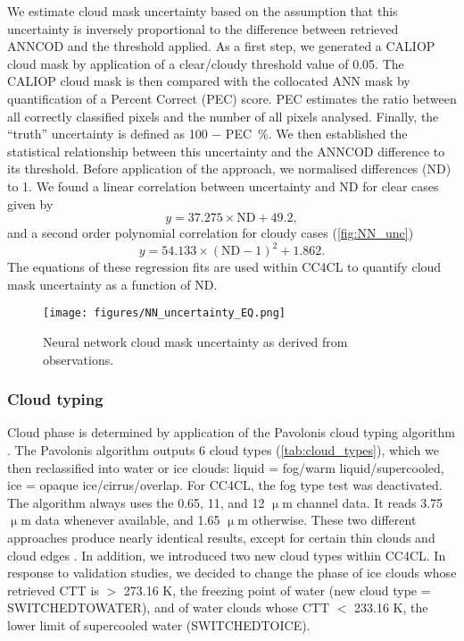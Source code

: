 We estimate cloud mask uncertainty based on the assumption that this uncertainty is inversely proportional to the difference between retrieved ANNCOD and the threshold applied. As a first step, we generated a CALIOP cloud mask by application of a clear/cloudy threshold value of 0.05. The CALIOP cloud mask is then compared with the collocated ANN mask by quantification of a Percent Correct (PEC) score. PEC estimates the ratio between all correctly classified pixels and the number of all pixels analysed. Finally, the ``truth'' uncertainty is defined as 100 $-$ PEC~\%. We then established the statistical relationship between this uncertainty and the ANNCOD difference to its threshold. Before application of the approach, we normalised differences (ND) to 1. We found a linear correlation between uncertainty and ND for clear cases given by 
\begin{equation}
  y = 37.275 \times \mathrm{ND} + 49.2,
\end{equation}
and a second order polynomial correlation for cloudy cases (\autoref{fig:NN_unc})
\begin{equation}
  y = 54.133 \times (\mathrm{ND}-1)^2 + 1.862.
\end{equation}
The equations of these regression fits are used within CC4CL to quantify cloud mask uncertainty as a function of ND.

\begin{figure}[h]
  \texttt{[image: figures/NN\_uncertainty\_EQ.png]}
  \caption{Neural network cloud mask uncertainty as derived from observations.}
  \label{fig:NN_unc}
\end{figure}

\subsubsection{Cloud typing}\label{sec:Pavolonis}

Cloud phase is determined by application of the Pavolonis cloud typing algorithm \citep{Pavolonis05}. The Pavolonis algorithm outputs 6 cloud types (\cref{tab:cloud_types}), which we then reclassified into water or ice clouds: liquid = fog/warm liquid/supercooled, ice = opaque ice/cirrus/overlap. For CC4CL, the fog type test was deactivated. The algorithm always uses the 0.65, 11, and 12 $\upmu$m channel data. It reads 3.75 $\upmu$m data whenever available, and 1.65 $\upmu$m otherwise. These two different approaches produce nearly identical results, except for certain thin clouds and cloud edges \citep{Pavolonis05}. In addition, we introduced two new cloud types within CC4CL. In response to validation studies, we decided to change the phase of ice clouds whose retrieved CTT is $>$ 273.16 K, the freezing point of water (new cloud type = SWITCHED\textunderscore TO\textunderscore WATER), and of water clouds whose CTT $<$ 233.16 K, the lower limit of supercooled water (SWITCHED\textunderscore TO\textunderscore ICE).

